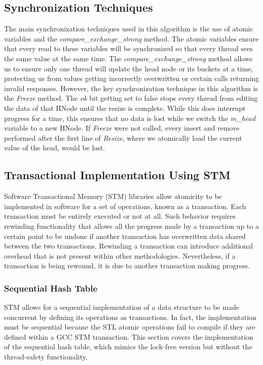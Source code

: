 \documentclass[11pt]{article} %
\begin{document}
\subsection{Synchronization Techniques}

The main synchronization techniques used in this algorithm is the use of atomic variables and the \textit{compare\_exchange\_strong} method. The atomic variables ensure that every read to these variables will be synchronized so that every thread sees the same value at the same time. The \textit{compare\_exchange\_strong} method allows us to ensure only one thread will update the head node or its buckets at a time, protecting us from values getting incorrectly overwritten or certain calls returning invalid responses. However, the key synchronization technique in this algorithm is the \textit{Freeze} method. The \textit{ok} bit getting set to false stops every thread from editing the data of that HNode until the resize is complete. While this does interrupt progress for a time, this ensures that no data is lost while we switch the \textit{m\_head} variable to a new HNode. If \textit{Freeze} were not called, every insert and remove performed after the first line of \textit{Resize}, where we atomically load the current value of the head, would be lost.

\subsection{Transactional Implementation Using STM}

Software Transactional Memory (STM) libraries allow atomicity to be implemented in software for a set of operations, known as a transaction. Each transaction must be entirely executed or not at all. Such behavior requires rewinding functionality that allows all the progress made by a transaction up to a certain point to be undone if another transaction has overwritten data shared between the two transactions. Rewinding a transaction can introduce additional overhead that is not present within other methodologies. Nevertheless, if a transaction is being rewound, it is due to another transaction making progress.

\subsubsection{Sequential Hash Table}

STM allows for a sequential implementation of a data structure to be made concurrent by defining its operations as transactions. In fact, the implementation must be sequential because the STL atomic operations fail to compile if they are defined within a GCC STM transaction. This section covers the implementation of the sequential hash table, which mimics the lock-free version but without the thread-safety functionality.
\end{document}
